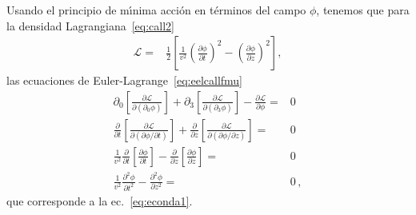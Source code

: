 Usando el principio de m\'\i nima acci\'on en t\'erminos del campo $\phi$, tenemos que para la densidad Lagrangiana~\eqref{eq:call2}
\begin{align}
  \mathcal{L}=&\frac{1}{2}  \left[
  \frac{1}{v^2}\left(\frac{\partial\phi}{\partial t}\right)^2-\left(\frac{\partial\phi}{\partial z}\right)^2
\right],
\end{align}
las ecuaciones de Euler-Lagrange~\eqref{eq:eelcallfmu}
\begin{align}
  \partial_0\left[\frac{\partial\mathcal{L}}{\partial(\partial_0\phi)}\right]+
\partial_3\left[\frac{\partial\mathcal{L}}{\partial(\partial_3\phi)}\right]
-\frac{\partial\mathcal{L}}{\partial\phi}=&0\nonumber\\
  \frac{\partial}{\partial t}\left[\frac{\partial\mathcal{L}}{\partial(\partial\phi/\partial t)}\right]+
\frac{\partial}{\partial z}\left[\frac{\partial\mathcal{L}}{\partial(\partial\phi/\partial z)}\right]
=&0\nonumber\\
 \frac{1}{v^2}\frac{\partial}{\partial t}\left[\frac{\partial\phi}{\partial t}\right]
-\frac{\partial}{\partial z}\left[\frac{\partial\phi}{\partial z}\right]=&0\nonumber\\
 \frac{1}{v^2}\frac{\partial^2\phi}{\partial t^2}-\frac{\partial^2\phi}{\partial z^2}=&0\,,
\end{align}
que corresponde a la ec.~\eqref{eq:econda1}.

